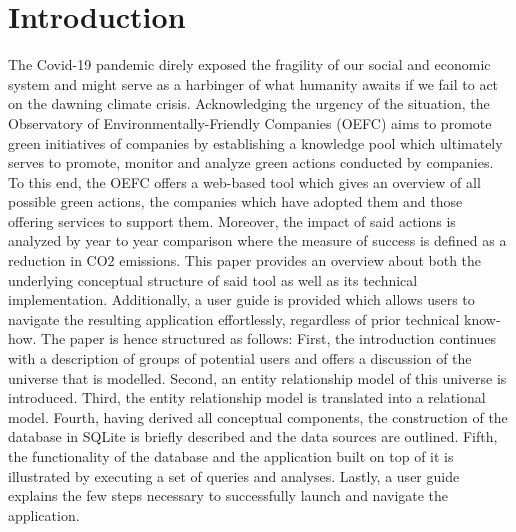 \renewcommand{\contentsname}{Table of Contents}
\tableofcontents
\clearpage

\section{Introduction}
The Covid-19 pandemic direly exposed the fragility of our social and economic system and might serve as a harbinger of what
humanity awaits if we fail to act on the dawning climate crisis.
Acknowledging the urgency of the situation, the Observatory of Environmentally-Friendly Companies (OEFC) aims to promote
green initiatives of companies by establishing a knowledge pool which ultimately serves to promote, monitor and analyze
green actions conducted by companies.
To this end, the OEFC offers a web-based tool which gives an overview of all possible green actions, the companies which
have adopted them and those offering services to support them.
Moreover, the impact of said actions is analyzed by year to year comparison where the measure of success is defined as a reduction in
CO2 emissions.
This paper provides an overview about both the underlying conceptual structure of said tool as well as its technical
implementation.
Additionally, a user guide is provided which allows users to navigate the resulting application effortlessly, regardless
of prior technical know-how.
The paper is hence structured as follows: First, the introduction continues with a description of groups of potential users and
offers a discussion of the universe that is modelled.
Second, an entity relationship model of this universe is introduced.
Third, the entity relationship model is translated into a relational model.
Fourth, having derived all conceptual components, the construction of the database in SQLite is briefly described and the
data sources are outlined.
Fifth, the functionality of the database and the application built on top of it is illustrated by executing a set of queries
and analyses.
Lastly, a user guide explains the few steps necessary to successfully launch and navigate the application.


